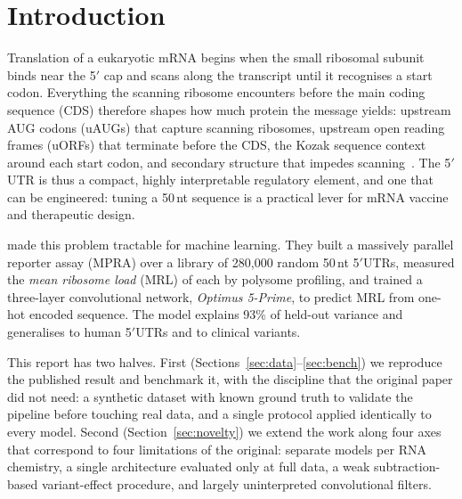 \documentclass{article}
\begin{document}
\section{Introduction}
\label{sec:intro}

Translation of a eukaryotic mRNA begins when the small ribosomal subunit binds near the
5$'$ cap and scans along the transcript until it recognises a start codon. Everything the
scanning ribosome encounters before the main coding sequence (CDS) therefore shapes how much
protein the message yields: upstream AUG codons (uAUGs) that capture scanning ribosomes,
upstream open reading frames (uORFs) that terminate before the CDS, the Kozak sequence
context around each start codon, and secondary structure that impedes scanning~\citep{kozak1986}. The 5$'$UTR
is thus a compact, highly interpretable regulatory element, and one that can be engineered:
tuning a 50\,nt sequence is a practical lever for mRNA vaccine and therapeutic design.

\citet{sample2019} made this problem tractable for machine learning. They built a massively
parallel reporter assay (MPRA) over a library of 280{,}000 random 50\,nt 5$'$UTRs, measured
the \emph{mean ribosome load} (MRL) of each by polysome profiling, and trained a
three-layer convolutional network, \emph{Optimus 5-Prime}, to predict MRL from one-hot
encoded sequence. The model explains 93\% of held-out variance and generalises to human
5$'$UTRs and to clinical variants.

This report has two halves. First (Sections~\ref{sec:data}--\ref{sec:bench}) we reproduce
the published result and benchmark it, with the discipline that the original paper did not
need: a synthetic dataset with known ground truth to validate the pipeline before touching
real data, and a single protocol applied identically to every model. Second
(Section~\ref{sec:novelty}) we extend the work along four axes that correspond to four
limitations of the original: separate models per RNA chemistry, a single architecture
evaluated only at full data, a weak subtraction-based variant-effect procedure, and
largely uninterpreted convolutional filters.
\end{document}
